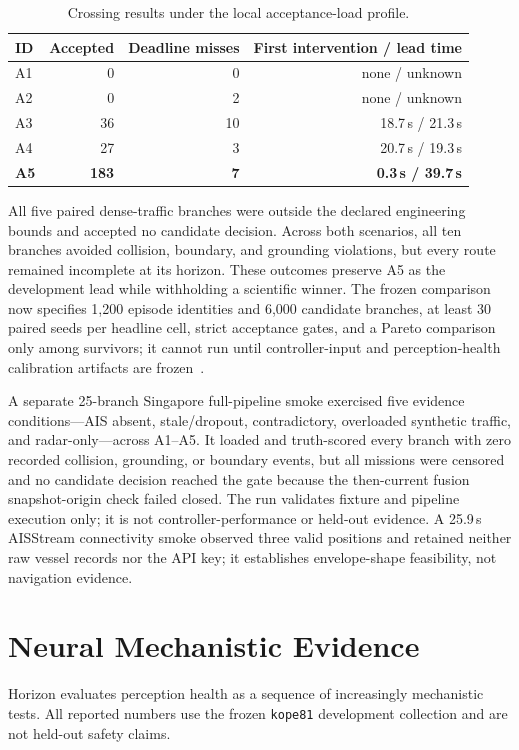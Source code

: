 \documentclass[sigconf,nonacm]{acmart}
\begin{document}
\begin{table}[t]
\centering
\caption{Crossing results under the local acceptance-load profile.}
\label{tab:acceptance}
\scriptsize
\begin{tabular}{@{}lrrr@{}}
\toprule
ID & Accepted & Deadline misses & First intervention / lead time\\
\midrule
A1 & 0 & 0 & none / unknown\\
A2 & 0 & 2 & none / unknown\\
A3 & 36 & 10 & 18.7\,s / 21.3\,s\\
A4 & 27 & 3 & 20.7\,s / 19.3\,s\\
\textbf{A5} & \textbf{183} & \textbf{7} & \textbf{0.3\,s / 39.7\,s}\\
\bottomrule
\end{tabular}
\end{table}

All five paired dense-traffic branches were outside the declared engineering bounds and accepted no candidate decision. Across both scenarios, all ten branches avoided collision, boundary, and grounding violations, but every route remained incomplete at its horizon. These outcomes preserve A5 as the development lead while withholding a scientific winner. The frozen comparison now specifies 1,200 episode identities and 6,000 candidate branches, at least 30 paired seeds per headline cell, strict acceptance gates, and a Pareto comparison only among survivors; it cannot run until controller-input and perception-health calibration artifacts are frozen~\cite{r46}.

A separate 25-branch Singapore full-pipeline smoke exercised five evidence conditions---AIS absent, stale/dropout, contradictory, overloaded synthetic traffic, and radar-only---across A1--A5. It loaded and truth-scored every branch with zero recorded collision, grounding, or boundary events, but all missions were censored and no candidate decision reached the gate because the then-current fusion snapshot-origin check failed closed. The run validates fixture and pipeline execution only; it is not controller-performance or held-out evidence. A 25.9\,s AISStream connectivity smoke observed three valid positions and retained neither raw vessel records nor the API key; it establishes envelope-shape feasibility, not navigation evidence.

\section{Neural Mechanistic Evidence}
Horizon evaluates perception health as a sequence of increasingly mechanistic
tests. All reported numbers use the frozen \texttt{kope81} development
collection and are not held-out safety claims.
\end{document}
